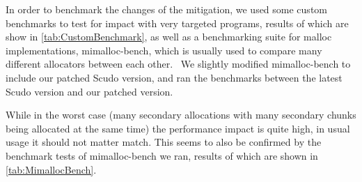 \documentclass[a4paper,11pt,oneside]{report}
\begin{document}
In order to benchmark the changes of the mitigation, we used some custom benchmarks to
test for impact with very targeted programs, results of which are show in
\autoref{tab:CustomBenchmark}, as well as a benchmarking suite for malloc implementations,
mimalloc-bench, which is usually used to compare many different allocators between each
other.~\cite{mimalloc-bench} We slightly modified mimalloc-bench to include our patched
Scudo version, and ran the benchmarks between the latest Scudo version and our patched
version.

While in the worst case (many secondary allocations with many secondary chunks being
allocated at the same time) the performance impact is quite high, in usual usage it should
not matter match. This seems to also be confirmed by the benchmark tests of mimalloc-bench
we ran, results of which are shown in \autoref{tab:MimallocBench}.
\end{document}
